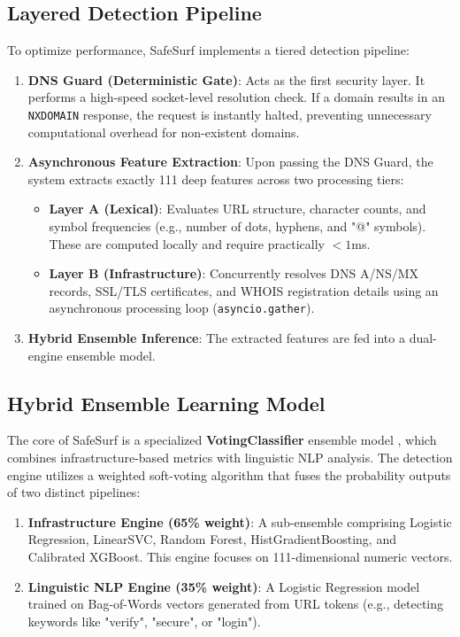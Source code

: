 \subsection{Layered Detection Pipeline}
To optimize performance, SafeSurf implements a tiered detection pipeline:
\begin{enumerate}
    \item \textbf{DNS Guard (Deterministic Gate)}: Acts as the first security layer. It performs a high-speed socket-level resolution check. If a domain results in an \texttt{NXDOMAIN} response, the request is instantly halted, preventing unnecessary computational overhead for non-existent domains.
    \item \textbf{Asynchronous Feature Extraction}: Upon passing the DNS Guard, the system extracts exactly 111 deep features across two processing tiers:
    \begin{itemize}
        \item \textbf{Layer A (Lexical)}: Evaluates URL structure, character counts, and symbol frequencies (e.g., number of dots, hyphens, and "@" symbols). These are computed locally and require practically $<1$ms.
        \item \textbf{Layer B (Infrastructure)}: Concurrently resolves DNS A/NS/MX records, SSL/TLS certificates, and WHOIS registration details using an asynchronous processing loop (\texttt{asyncio.gather}).
    \end{itemize}
    \item \textbf{Hybrid Ensemble Inference}: The extracted features are fed into a dual-engine ensemble model.
\end{enumerate}



\subsection{Hybrid Ensemble Learning Model}
The core of SafeSurf is a specialized \textbf{VotingClassifier} ensemble model \cite{ref9}, which combines infrastructure-based metrics with linguistic NLP analysis. The detection engine utilizes a weighted soft-voting algorithm that fuses the probability outputs of two distinct pipelines:
\begin{enumerate}
    \item \textbf{Infrastructure Engine (65\% weight)}: A sub-ensemble comprising Logistic Regression, LinearSVC, Random Forest, HistGradientBoosting, and Calibrated XGBoost. This engine focuses on 111-dimensional numeric vectors.
    \item \textbf{Linguistic NLP Engine (35\% weight)}: A Logistic Regression model trained on Bag-of-Words vectors generated from URL tokens (e.g., detecting keywords like "verify", "secure", or "login").
\end{enumerate}

